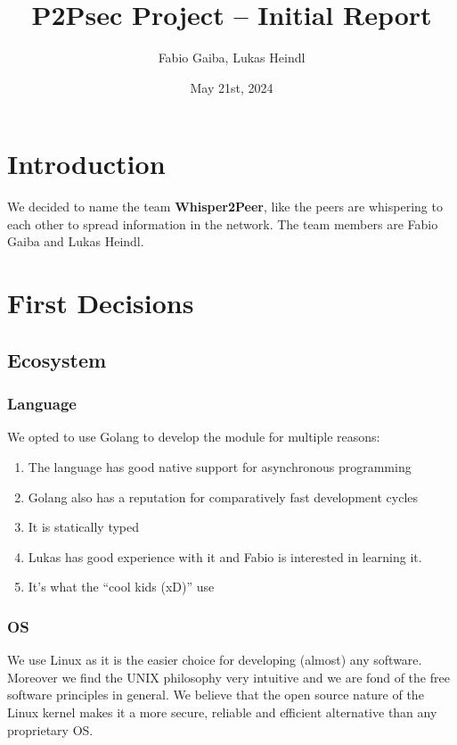 \documentclass[a4paper,english,10pt,NET]{tumarticle}
\title{P2Psec Project -- Initial Report}
\author{Fabio Gaiba, Lukas Heindl}
\date{May 21st, 2024}
\begin{document}
\maketitle
\thispagestyle{tumarticle}

\section{Introduction}

We decided to name the team \textbf{Whisper2Peer}, like the peers are whispering to each other to spread information in the network. The team members are Fabio Gaiba and Lukas Heindl.

\section{First Decisions}
\subsection{Ecosystem}
\subsubsection{Language}

We opted to use Golang to develop the module for multiple reasons:

\begin{enumerate}
	\item The language has good native support for asynchronous programming 
	\item Golang also has a reputation for comparatively fast development cycles
	\item It is statically typed  
	\item Lukas has good experience with it and Fabio is interested in learning it.
	\item It's what the \enquote{cool kids (xD)} use
\end{enumerate}

\subsubsection{OS}
We use Linux as it is the easier choice for developing (almost) any software. Moreover we find the UNIX philosophy very intuitive and we are fond of the free software principles in general. We believe that the open source nature of the Linux kernel makes it a more secure, reliable and efficient alternative than any proprietary OS.
\end{document}
